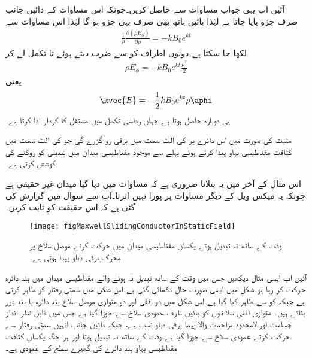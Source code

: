 آئیں اب یہی جواب مساوات  سے حاصل کریں۔چونکہ اس مساوات کے دائیں جانب صرف  جزو پایا جاتا ہے لہٰذا بائیں ہاتھ بھی صرف یہی جزو ہو گا لہٰذا اس مساوات سے
\begin{align*}
\frac{1}{\rho} \frac{\partial (\rho E_{\phi})}{\partial \rho}=-k B_0 e^{kt}
\end{align*}
لکھا جا سکتا ہے۔دونوں اطراف کو  سے ضرب دیتے ہوئے   تا  تکمل لے کر
\begin{align*}
\rho E_{\phi}=-k B_0 e^{k t} \frac{\rho^2}{2}
\end{align*}
یعنی
\begin{align}
\kvec{E}=-\frac{1}{2} k B_0 e^{kt} \rho \aphi
\end{align}
ہی دوبارہ حاصل ہوتا ہے جہاں رداسی تکمل میں  مستقل کا کردار ادا کرتا ہے۔

مثبت  کی صورت میں اس دائرے پر  کی الٹ سمت میں برقی رو گزرے گی جو  کی الٹ سمت میں کثافت مقناطیسی بہاو پیدا کرتے ہوئے پہلے سے موجود مقناطیسی میدان میں تبدیلی کو روکنے کی کوشش کرتی ہے۔

اس مثال کے آخر میں یہ بتلانا ضروری ہے کہ مساوات  میں دیا گیا میدان غیر حقیقی ہے چونکہ یہ میکس ویل کے دیگر مساوات پر پورا نہیں اترتا۔آپ سے سوال  میں گزارش کی گئی ہے کہ اس حقیقت کو ثابت کریں۔

\begin{figure}
\centering
\texttt{[image: figMaxwellSlidingConductorInStaticField]}
\caption{وقت کے ساتھ نہ تبدیل ہوتے یکساں مقناطیسی میدان میں حرکت کرتے موصل سلاخ پر محرک برقی دباو پیدا ہوتی ہے۔}
\label{شکل_میکس_ویل_محرک_سلاخ_محرک_دباو}
\end{figure}

آئیں اب ایسی مثال دیکھیں جس میں وقت کے ساتھ تبدیل نہ ہونے والے مقناطیسی میدان میں  بند دائرہ حرکت کر رہا ہو۔شکل  میں ایسی صورت حال دکھائی گئی ہے۔اس شکل میں  سمتی رفتار کو ظاہر کرتی ہے جبکہ  کو  سے  ظاہر کیا گیا ہے۔اس شکل میں دو افقی اور دو متوازی موصل سلاخ بند دائرہ یا بند دور بناتے ہیں۔ متوازی افقی سلاخوں کو بائیں طرف عمودی سلاخ سے جوڑا گیا ہے جس میں قابل نظر انداز جسامت اور لامحدود مزاحمت والا پیما برقی دباو نسب ہے، جبکہ دائیں جانب انہیں  سمتی رفتار سے حرکت کرتے عمودی سلاخ سے جوڑا گیا ہے۔وقت کے ساتھ نہ تبدیل ہوتا اور ہر جگہ یکساں کثافت مقناطیسی بہاو  بند دائرے کی گھیرے سطح کے عمودی ہے۔

